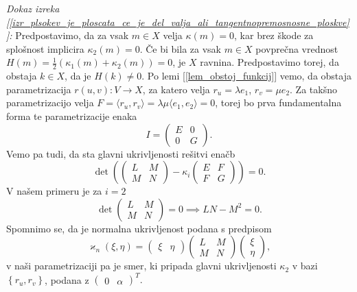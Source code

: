 \noindent
{\em Dokaz izreka [\ref{izr_plsokev_je_ploscata_ce_je_del_valja_ali_tangentnopremosnosne_ploskve}]:\/}
Predpostavimo, da za vsak $m \in X$ velja $\kappa(m) = 0$, kar brez škode za splošnost implicira $\kappa_2(m) = 0$. Če bi bila za vsak $m \in X$ povprečna vrednost $H(m) = \frac{1}{2}(\kappa_1(m) + \kappa_2(m))= 0$, je $X$ ravnina. Predpostavimo torej, da obstaja
$k \in  X$, da je $H(k) \neq 0$.
Po lemi [\ref{lem_obstoj_funkcij}] vemo, da obstaja parametrizacija $r(u,v): V \to X$, za katero velja $r_u = \lambda e_1$, $r_v = \mu e_2$. 
Za takšno parametrizacijo velja $F = \langle r_u, r_v \rangle = \lambda \mu \langle e_1, e_2 \rangle = 0$, torej bo prva fundamentalna forma te parametrizacije enaka \begin{equation*}
I = \begin{pmatrix}
E & 0 \\
0 & G
\end{pmatrix}.
\end{equation*}  
Vemo pa tudi, da sta glavni ukrivljenosti rešitvi enačb \begin{equation*} \det \left( \begin{pmatrix}
  L & M \\
  M & N
  \end{pmatrix} - \kappa_i \begin{pmatrix}
  E & F \\
  F & G
  \end{pmatrix}  \right) = 0. \end{equation*}
V našem primeru je za $i = 2$ \begin{equation*}
  \det  \begin{pmatrix}
    L & M \\
    M & N
    \end{pmatrix} = 0 \implies LN - M^2 = 0.
\end{equation*}  
Spomnimo se, da je normalna ukrivljenost podana s predpisom \begin{equation*}
\varkappa_n(\xi, \eta) = \begin{pmatrix}
    \xi & \eta
\end{pmatrix} \begin{pmatrix}
L & M \\
M & N
\end{pmatrix} \begin{pmatrix}
  \xi \\ \eta
\end{pmatrix},
\end{equation*}  
v naši parametrizaciji pa je smer, ki pripada glavni ukrivljenosti $\kappa_2$ v bazi $\left\{ r_u, r_v\right\}$, podana z $\begin{pmatrix}
    0 & \alpha
\end{pmatrix}^{T}.$
